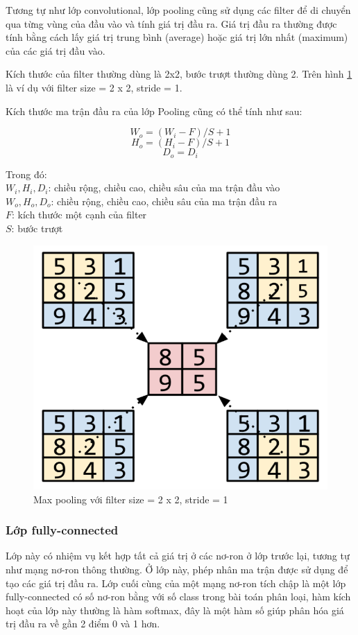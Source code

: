 \documentclass[a4paper,14pt]{extreport}
\begin{document}
Tương tự như lớp convolutional, lớp pooling cũng sử dụng các filter để di chuyển qua từng vùng của đầu vào và tính giá trị đầu ra. Giá trị đầu ra thường được tính bằng cách lấy giá trị trung bình (average) hoặc giá trị lớn nhất (maximum) của các giá trị đầu vào.

Kích thước của filter thường dùng là 2x2, bước trượt thường dùng 2. Trên hình \ref{fig:max-pooling} là ví dụ với filter size = 2 x 2, stride = 1.

Kích thước ma trận đầu ra của lớp Pooling cũng có thể tính như sau:

\[ W_o = (W_i - F) / S + 1 \]
\[ H_o = (H_i - F) / S + 1 \]
\[ D_o = D_i \]

Trong đó: \\
$ W_i, H_i, D_i $: chiều rộng, chiều cao, chiều sâu của ma trận đầu vào \\
$ W_o, H_o, D_o $: chiều rộng, chiều cao, chiều sâu của ma trận đầu ra \\
$ F $: kích thước một cạnh của filter \\
$ S $: bước trượt \\

\begin{figure}  
    \centering
    \includegraphics[scale=0.7]{img/maxpooling.png}
    \caption{Max pooling với filter size = 2 x 2, stride = 1}
    \label{fig:max-pooling}
\end{figure}

\subsubsection*{Lớp fully-connected}
Lớp này có nhiệm vụ kết hợp tất cả giá trị ở các nơ-ron ở lớp trước lại, tương tự như mạng nơ-ron thông thường. 
Ở lớp này, phép nhân ma trận được sử dụng để tạo các giá trị đầu ra. Lớp cuối cùng của một mạng nơ-ron tích 
chập là một lớp fully-connected có số nơ-ron bằng với số class trong bài toán phân loại, hàm kích hoạt của 
lớp này thường là hàm softmax, đây là một hàm số giúp phân hóa giá trị đầu ra về gần 2 điểm 0 và 1 hơn.
\end{document}
